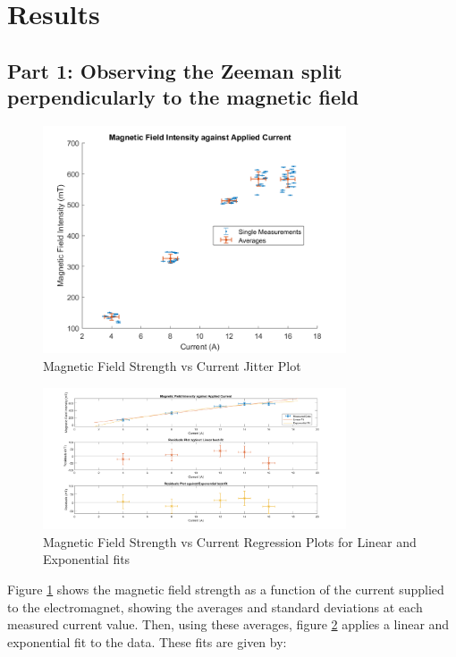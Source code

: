 

\section{Results}

\subsection{Part 1: Observing the Zeeman split perpendicularly to the magnetic field}

\begin{figure}
    \centering
    \includegraphics[width=0.8\textwidth]{Results/Figures/Magnetic_Field_vs_Current_jitter.png}
    \caption{Magnetic Field Strength vs Current Jitter Plot}
    \label{fig:magnetic_field_vs_current_jitter}
\end{figure}
\begin{figure}
    \centering
    \includegraphics[width=0.8\textwidth]{Results/Figures/Magnetic_Field_vs_Current.png}
    \caption{Magnetic Field Strength vs Current Regression Plots for Linear and Exponential fits}
    \label{fig:magnetic_field_vs_current}
\end{figure}
Figure \ref{fig:magnetic_field_vs_current_jitter} shows the magnetic field strength as a function of the current supplied to the electromagnet, showing the averages and standard deviations at each measured current value. Then, using these averages, figure \ref{fig:magnetic_field_vs_current} applies a linear and exponential fit to the data. These fits are given by:
